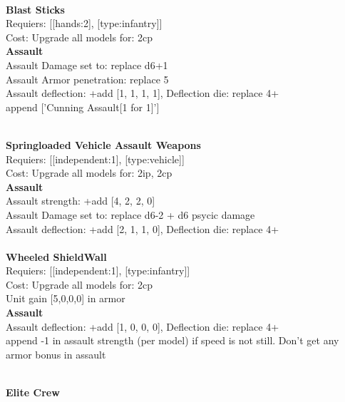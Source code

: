\ \\
{\bf Blast Sticks } \\

Requiers: [[hands:2], [type:infantry]] \\
Cost: Upgrade all models for: 2cp \\




{\bf Assault} \ \\
Assault Damage set to: replace d6+1
\\ 
Assault Armor penetration: replace 5 
\\ 
Assault deflection: +add [1, 1, 1, 1], Deflection die: replace 4+
\\ 

append ['Cunning Assault[1 for 1]']


\ \\
{\bf Springloaded Vehicle Assault Weapons } \\

Requiers: [[independent:1], [type:vehicle]] \\
Cost: Upgrade all models for: 2ip, 2cp \\




{\bf Assault} \ \\
Assault strength: +add [4, 2, 2, 0] 
\\ 
Assault Damage set to: replace d6-2 + d6 psycic damage
\\ 
Assault deflection: +add [2, 1, 1, 0], Deflection die: replace 4+
\\ 




\ \\
{\bf Wheeled ShieldWall } \\

Requiers: [[independent:1], [type:infantry]] \\
Cost: Upgrade all models for: 2cp \\
Unit gain [5,0,0,0] in armor\\ 




{\bf Assault} \ \\
Assault deflection: +add [1, 0, 0, 0], Deflection die: replace 4+
\\ 

append -1 in assault strength (per model) if speed is not still. Don't get any armor bonus in assault


\ \\
{\bf Elite Crew } \\


